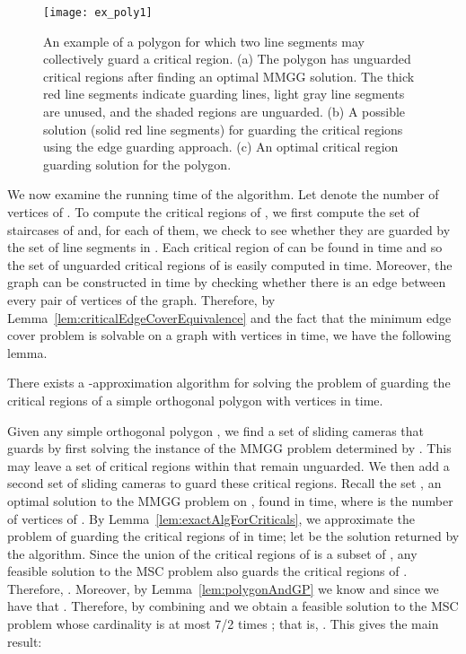 \documentclass{llncs}
\begin{document}
\begin{figure}[t!]
\centering \texttt{[image: ex\_poly1]}
\caption{An example of a polygon for which two line segments may collectively guard a critical region.  (a) The polygon has unguarded critical regions after finding an optimal MMGG solution. The thick red line segments indicate guarding lines, light gray line segments are unused, and the shaded regions are unguarded.
(b) A possible solution (solid red line segments) for guarding the critical regions using the edge guarding approach. (c) An optimal critical region guarding solution for the polygon.}
\label{fig:ex_poly}\end{figure}

We now examine the running time of the algorithm. Let  denote the number of vertices of .
To compute the critical regions of , we first compute the set of staircases of  and, for each of them, we check to see whether
they are guarded by the set of line segments in . Each critical region of  can be found
in  time and so the set of unguarded critical regions of  is easily computed in  time.
Moreover, the graph  can be constructed
in  time by checking whether there is an edge between every pair of vertices of the graph. Therefore,
by Lemma~\ref{lem:criticalEdgeCoverEquivalence} and the fact that the minimum edge cover
problem is solvable on a graph with  vertices in  time, we have the following
lemma.
\begin{lemma}
\label{lem:exactAlgForCriticals}
There exists a -approximation algorithm for solving the problem of guarding the critical regions of
a simple orthogonal polygon  with  vertices in  time.
\end{lemma}

Given any simple orthogonal polygon , we find a set of sliding cameras that guards  
by first solving the instance  of the MMGG problem determined by . This may leave a set of critical regions within 
that remain unguarded. We then add a second set of sliding cameras to guard these critical regions.
Recall the set , an optimal solution to the MMGG problem on , found in  time,
where  is the number of vertices of .
By Lemma~\ref{lem:exactAlgForCriticals}, we approximate the problem of guarding the critical
regions of  in  time;
let  be the solution returned by the algorithm. 
Since the union of the critical regions of  is
a subset of , any feasible solution to the MSC problem also guards the critical regions of . 
Therefore, .
Moreover, by Lemma~\ref{lem:polygonAndGP} we know  and since
 we have that .
Therefore, by combining  and  we obtain a feasible solution
to the MSC problem whose cardinality is at most 7/2 times ; that is,
. This gives the main result:
\end{document}
